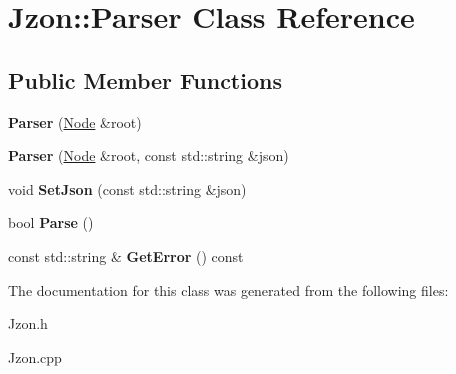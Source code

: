 \hypertarget{class_jzon_1_1_parser}{\section{Jzon\-:\-:Parser Class Reference}
\label{class_jzon_1_1_parser}
}
\subsection*{Public Member Functions}
\begin{DoxyCompactItemize}
\item 
\hypertarget{class_jzon_1_1_parser_ae6e5c8815bf569f85afc7aa974be185c}{{\bfseries Parser} (\hyperlink{class_jzon_1_1_node}{Node} \&root)}\label{class_jzon_1_1_parser_ae6e5c8815bf569f85afc7aa974be185c}

\item 
\hypertarget{class_jzon_1_1_parser_aa4db81087c1000c4d7cba127405fd12d}{{\bfseries Parser} (\hyperlink{class_jzon_1_1_node}{Node} \&root, const std\-::string \&json)}\label{class_jzon_1_1_parser_aa4db81087c1000c4d7cba127405fd12d}

\item 
\hypertarget{class_jzon_1_1_parser_a13811b1efc16acf444a9ae41bdc84eed}{void {\bfseries Set\-Json} (const std\-::string \&json)}\label{class_jzon_1_1_parser_a13811b1efc16acf444a9ae41bdc84eed}

\item 
\hypertarget{class_jzon_1_1_parser_ac0897dfcf6f0f5ec1605564b9064c3fe}{bool {\bfseries Parse} ()}\label{class_jzon_1_1_parser_ac0897dfcf6f0f5ec1605564b9064c3fe}

\item 
\hypertarget{class_jzon_1_1_parser_a15f064f5f56458a205f67fae85ac6955}{const std\-::string \& {\bfseries Get\-Error} () const }\label{class_jzon_1_1_parser_a15f064f5f56458a205f67fae85ac6955}

\end{DoxyCompactItemize}


The documentation for this class was generated from the following files\-:\begin{DoxyCompactItemize}
\item 
Jzon.\-h\item 
Jzon.\-cpp\end{DoxyCompactItemize}
